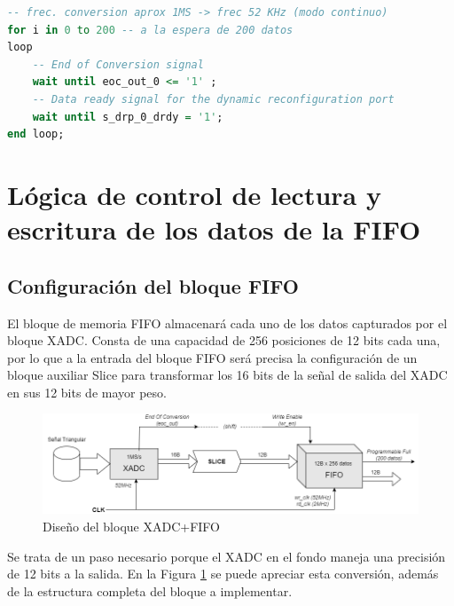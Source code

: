 \begin{lstlisting}[language=VHDL, style=mystyle, caption={Bucle de conversión de los 200 datos}]
-- frec. conversion aprox 1MS -> frec 52 KHz (modo continuo)
for i in 0 to 200 -- a la espera de 200 datos 
loop     
    -- End of Conversion signal 
    wait until eoc_out_0 <= '1' ; 
    -- Data ready signal for the dynamic reconfiguration port  
    wait until s_drp_0_drdy = '1'; 
end loop;
\end{lstlisting}

\section{Lógica de control de lectura y escritura de los datos de la FIFO}

\subsection{Configuración del bloque FIFO}
\label{section:fifo}

El bloque de memoria FIFO almacenará cada uno de los datos capturados por el bloque XADC. Consta de una capacidad de 256 posiciones de 12 bits cada una, por lo que a la entrada del bloque FIFO será precisa la configuración de un bloque auxiliar Slice para transformar los 16 bits de la señal de salida del XADC en sus 12 bits de mayor peso. 

\vspace{3mm}

\begin{figure}[h]
    \centering
    \includegraphics[width=1\textwidth]{img/diseno/xadc_fifo.drawio.PNG}
    \caption{Diseño del bloque XADC+FIFO}
    \label{fig:xadc_fifo}
\end{figure}
    
\vspace{3mm}

Se trata de un paso necesario porque el XADC en el fondo maneja una precisión de 12 bits a la salida. En la Figura \ref*{fig:xadc_fifo} se puede apreciar esta conversión, además de la estructura completa del bloque a implementar.

